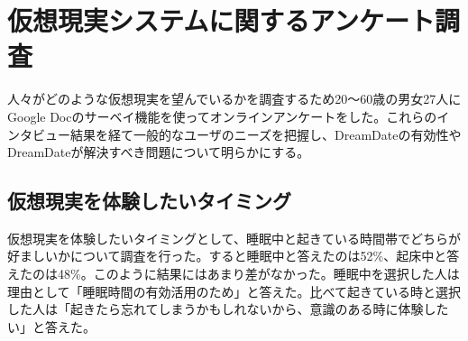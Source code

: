 \section{仮想現実システムに関するアンケート調査}
人々がどのような仮想現実を望んでいるかを調査するため20〜60歳の男女27人にGoogle Docのサーベイ機能を使ってオンラインアンケートをした。これらのインタビュー結果を経て一般的なユーザのニーズを把握し、DreamDateの有効性やDreamDateが解決すべき問題について明らかにする。





\subsection{仮想現実を体験したいタイミング }
仮想現実を体験したいタイミングとして、睡眠中と起きている時間帯でどちらが好ましいかについて調査を行った。すると睡眠中と答えたのは52\%、起床中と答えたのは48\%。このように結果にはあまり差がなかった。睡眠中を選択した人は理由として「睡眠時間の有効活用のため」と答えた。比べて起きている時と選択した人は「起きたら忘れてしまうかもしれないから、意識のある時に体験したい」と答えた。

